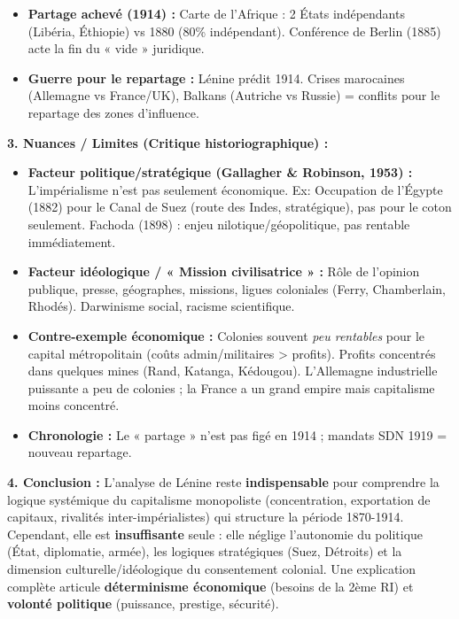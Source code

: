 \documentclass[11pt]{article}
\newcommand{\cle}[1]{{\popxbold\color{popdark}#1}}
\begin{document}
\begin{exoresolu}
\begin{itemize}
    \item \textbf{Partage achevé (1914) :} Carte de l'Afrique : 2 États indépendants (Libéria, Éthiopie) vs 1880 (80\% indépendant). Conférence de Berlin (1885) acte la fin du « vide » juridique.
    \item \textbf{Guerre pour le repartage :} Lénine prédit 1914. Crises marocaines (Allemagne vs France/UK), Balkans (Autriche vs Russie) = conflits pour le repartage des zones d'influence.
\end{itemize}
\textbf{3. Nuances / Limites (Critique historiographique) :}
\begin{itemize}
    \item \textbf{Facteur politique/stratégique (Gallagher \& Robinson, 1953) :} L'impérialisme n'est pas seulement économique. Ex: Occupation de l'Égypte (1882) pour le \cle{Canal de Suez} (route des Indes, stratégique), pas pour le coton seulement. \cle{Fachoda} (1898) : enjeu nilotique/géopolitique, pas rentable immédiatement.
    \item \textbf{Facteur idéologique / « Mission civilisatrice » :} Rôle de l'opinion publique, presse, géographes, missions, ligues coloniales (Ferry, Chamberlain, Rhodés). \cle{Darwinisme social}, racisme scientifique.
    \item \textbf{Contre-exemple économique :} Colonies souvent \emph{peu rentables} pour le capital métropolitain (coûts admin/militaires > profits). Profits concentrés dans quelques mines (Rand, Katanga, Kédougou). L'Allemagne industrielle puissante a peu de colonies ; la France a un grand empire mais capitalisme moins concentré.
    \item \textbf{Chronologie :} Le « partage » n'est pas figé en 1914 ; mandats SDN 1919 = nouveau repartage.
\end{itemize}
\textbf{4. Conclusion :}
L'analyse de Lénine reste \textbf{indispensable} pour comprendre la \cle{logique systémique} du capitalisme monopoliste (concentration, exportation de capitaux, rivalités inter-impérialistes) qui structure la période 1870-1914. Cependant, elle est \textbf{insuffisante} seule : elle néglige l'autonomie du politique (État, diplomatie, armée), les logiques stratégiques (Suez, Détroits) et la dimension culturelle/idéologique du consentement colonial. Une explication complète articule \textbf{déterminisme économique} (besoins de la 2ème RI) et \textbf{volonté politique} (puissance, prestige, sécurité).
\end{exoresolu}
\end{document}
